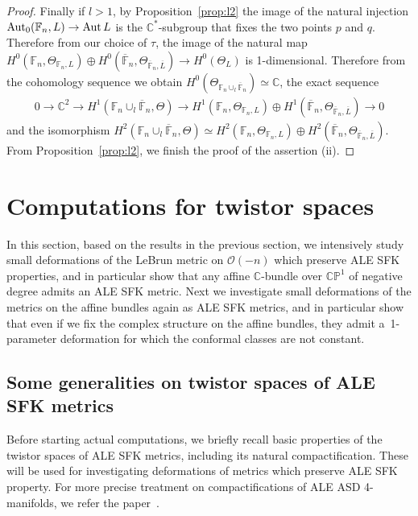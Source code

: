\documentclass[pdftex]{sigma}
\numberwithin{equation}{section}
\DeclareMathOperator{\Aut}{Aut}
\begin{document}
\begin{proof}
Finally if $l>1$, by Proposition~\ref{prop:l2} the image of the natural injection ${\rm{Aut}}_0(\mathbb{F}_n,L)\to \Aut
L$ is the $\mathbb{C}^*$-subgroup that f\/ixes the two points $p$ and $q$.
Therefore from our choice of $\tau$, the image of the natural map $H^0(\mathbb{F}_n, \Theta_{\mathbb{F}_n,L}) \oplus H^0
(\overline{\mathbb{F}}_n,\Theta_{\overline{\mathbb{F}}_n,\overline L})\to H^0(\Theta_L)$ is 1-dimensional.
Therefore from the cohomology sequence we obtain $H^0(\Theta_{\mathbb{F}_n\cup_l\overline{\mathbb{F}}_n})
\simeq\mathbb{C}$, the exact sequence
\begin{gather*}
0
\longrightarrow
\mathbb{C}^2
\longrightarrow
H^1 (\mathbb{F}_n \cup_l \overline{\mathbb{F}}_n,\Theta)
\longrightarrow
H^1(\mathbb{F}_n, \Theta_{\mathbb{F}_n,L}) \oplus H^1
(\overline{\mathbb{F}}_n,\Theta_{\overline{\mathbb{F}}_n,\overline L})
\longrightarrow
0
\end{gather*}
and the isomorphism $H^2 (\mathbb{F}_n \cup_l \overline{\mathbb{F}}_n,\Theta) \simeq H^2(\mathbb{F}_n,
\Theta_{\mathbb{F}_n,L}) \oplus H^2 (\overline{\mathbb{F}}_n,\Theta_{\overline{\mathbb{F}}_n,\overline L})$.
From Proposition~\ref{prop:l2}, we f\/inish the proof of the assertion (ii).
\end{proof}

\section{Computations for twistor spaces}
\label{explicit}

In this section, based on the results in the previous section, we intensively study small deformations of the LeBrun
metric on $\mathscr O(-n)$ which preserve ALE SFK properties, and in particular show that any af\/f\/ine
$\mathbb{C}$-bundle over $\mathbb{CP}^1$ of negative degree admits an ALE SFK metric.
Next we investigate small deformations of the metrics on the af\/f\/ine bundles again as ALE SFK metrics, and in
particular show that even if we f\/ix the complex structure on the af\/f\/ine bundles, they admit a~1-parameter
deformation for which the conformal classes are not constant.

\subsection{Some generalities on twistor spaces of ALE SFK metrics} %

Before starting actual computations, we brief\/ly recall basic properties of the twistor spaces of ALE SFK metrics,
including its natural compactif\/ication.
These will be used for investigating deformations of metrics which preserve ALE SFK property.
For more precise treatment on compactif\/ications of ALE ASD 4-manifolds, we refer the paper~\cite{V}.
\end{document}
